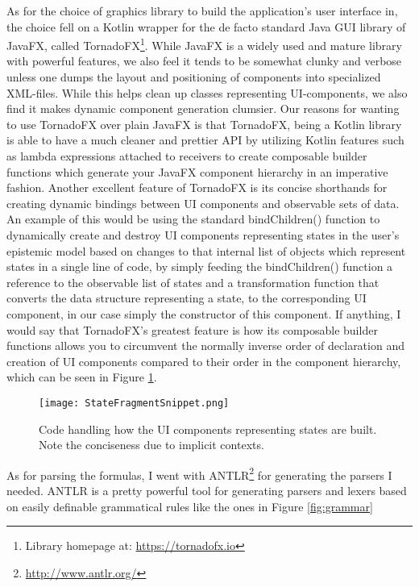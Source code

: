 As for the choice of graphics library to build the application's user interface in, the choice fell on a Kotlin wrapper for the de facto standard Java GUI library of JavaFX, called TornadoFX\footnote{Library homepage at: \url{https://tornadofx.io}}. While JavaFX is a widely used and mature library with powerful features, we also feel it tends to be somewhat clunky and verbose unless one dumps the layout and positioning of components into specialized XML-files. While this helps clean up classes representing UI-components, we also find it makes dynamic component generation clumsier. Our reasons for wanting to use TornadoFX over plain JavaFX is that TornadoFX, being a Kotlin library is able to have a much cleaner and prettier API by utilizing Kotlin features such as lambda expressions attached to receivers to create composable builder functions which generate your JavaFX component hierarchy in an imperative fashion. Another excellent feature of TornadoFX is its concise shorthands for creating dynamic bindings between UI components and observable sets of data. An example of this would be using the standard bindChildren() function to dynamically create and destroy UI components representing states in the user's epistemic model based on changes to that internal list of objects which represent states in a single line of code, by simply feeding the bindChildren() function a reference to the observable list of states and a transformation function that converts the data structure representing a state, to the corresponding UI component, in our case simply the constructor of this component. If anything, I would say that TornadoFX's greatest feature is how its composable builder functions allows you to circumvent the normally inverse order of declaration and creation of UI components compared to their order in the component hierarchy, which can be seen in Figure \ref{fig:StatFragSnip}. 

\begin{figure}[h]
	\label{fig:StatFragSnip}
	\caption{Code handling how the UI components representing states are built. Note the conciseness due to implicit contexts.}
	\texttt{[image: StateFragmentSnippet.png]}
\end{figure}

As for parsing the formulas, I went with ANTLR\footnote{\url{http://www.antlr.org/}} for generating the parsers I needed. ANTLR is a pretty powerful tool for generating parsers and lexers based on easily definable grammatical rules like the ones in Figure \ref{fig:grammar}

